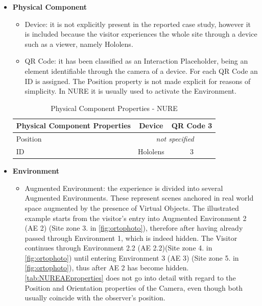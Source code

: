 \begin{itemize}
    \item \textbf{Physical Component}
    \begin{itemize}
        \item Device: it is not explicitly present in the reported case study, however it is included because the visitor experiences the whole site through a device such as a viewer, namely Hololens.
        \item QR Code: it has been classified as an Interaction Placeholder, being an element identifiable through the camera of a device. For each QR Code an ID is assigned. The Position property is not made explicit for reasons of simplicity. In NURE it is usually used to activate the Environment.
    \end{itemize}
    \begin{table}[h]
    \centering
    \begin{tabular}{|l|c|c|}
    \hline
    \textbf{Physical Component Properties} & \textbf{Device}     & \textbf{QR Code 3}    \\ \hline
    Position                               & \multicolumn{2}{c|}{\textit{not specified}} \\ \hline
    ID                                     & Hololens            & 3                     \\ \hline
    \end{tabular}
    \caption{Physical Component Properties - NURE}
    \label{tab:NUREPHCproperties}
    \end{table}
    \item \textbf{Environment}
    \begin{itemize}
        \item Augmented Environment: the experience is divided into several Augmented Environments. These represent scenes anchored in real world space augmented by the presence of Virtual Objects. The illustrated example starts from the visitor's entry into Augmented Environment 2 (AE 2) (Site zone 3. in \autoref{fig:ortophoto}), therefore after having already passed through Environment 1, which is indeed hidden. The Visitor continues through Environment 2.2 (AE 2.2)(Site zone 4. in \autoref{fig:ortophoto}) until entering Environment 3 (AE 3) (Site zone 5. in \autoref{fig:ortophoto}), thus after AE 2 has become hidden. 
        \autoref{tab:NUREAEproperties} does not go into detail with regard to the Position and Orientation properties of the Camera, even though both usually coincide with the observer's position.

\end{itemize}
\end{itemize}
